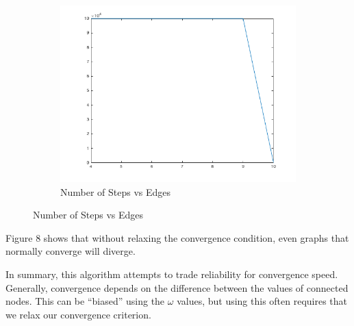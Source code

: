 \documentclass{article}
\begin{document}
\begin{figure}[h!]
\begin{subfigure}[t]{0.3\textwidth}
\centering
\includegraphics[width=\textwidth]{pi-ov2-om0-3-conv.png}
\caption{Number of Steps vs Edges}
\end{subfigure}
\end{figure}
Figure 8 shows that without relaxing the convergence condition, even graphs that
normally converge will diverge. 

In summary, this algorithm attempts to trade reliability for convergence speed.
Generally, convergence depends on the difference between the values of connected
nodes. This can be ``biased'' using the $\omega$ values, but using this often
requires that we relax our convergence criterion. 
\end{document}

